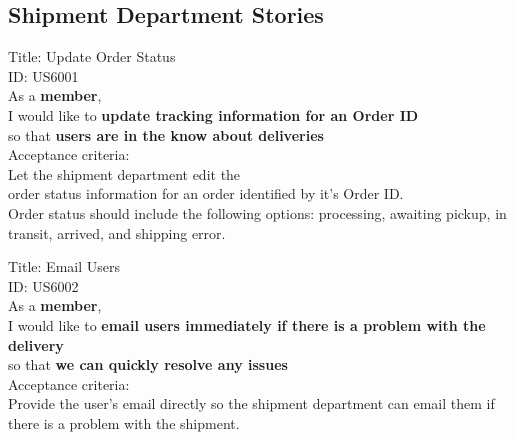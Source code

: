 \documentclass{article}
\begin{document}
\subsection{Shipment Department Stories}
\begin{framed}
\noindent
Title:  Update Order Status \\
ID: US6001 \\
As a \textbf{member},\\
\textbullet  \quad \quad I would like to \textbf{update tracking information for an Order ID}\\ 
\textbullet  \quad \quad so that \textbf{users are in the know about deliveries}\\
Acceptance criteria: \\
\textbullet  \quad \quad Let the shipment department edit the\\ order status information for an order identified by it's Order ID.\\
\textbullet  \quad \quad Order status should include the following options: processing, awaiting pickup, in transit, arrived, and shipping error.
\end{framed}


\begin{framed}
\noindent
Title:  Email Users \\
ID: US6002 \\
As a \textbf{member},\\
\textbullet  \quad \quad I would like to \textbf{email users immediately if there is a problem with the delivery}\\ 
\textbullet  \quad \quad so that \textbf{we can quickly resolve any issues}\\
Acceptance criteria: \\
\textbullet  \quad \quad Provide the user's email directly so the shipment department can email them if there is a problem with the shipment.
\end{framed}
\end{document}
